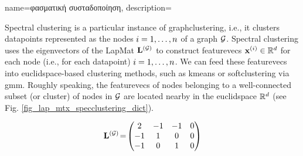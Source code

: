 {name={\foreignlanguage{greek}{φασματική συσταδοποίηση}},
	description={Spectral \gls{clustering} is a particular instance of 
		\gls{graphclustering}, i.e., it clusters \gls{datapoint}s 
		represented as the nodes $i=1, \ldots, n$ of a \gls{graph} $\mathcal{G}$. 
		Spectral \gls{clustering} uses the \gls{eigenvector}s of the \gls{LapMat} ${\bf L}^{(\mathcal{G})}$ 
		to construct \gls{featurevec}s ${\bf x}^{(i)} \in \mathbb{R}^{d}$ 
		for each node (i.e., for each \gls{datapoint}) $i=1, \ldots, n$. We can feed these \gls{featurevec}s 
		into \gls{euclidspace}-based \gls{clustering} methods, such as \gls{kmeans} 
		or \gls{softclustering} via \gls{gmm}. Roughly speaking, the \gls{featurevec}s of nodes 
		belonging to a well-connected subset (or \gls{cluster}) of nodes in $\mathcal{G}$ are located 
		nearby in the \gls{euclidspace} $\mathbb{R}^{d}$ (see Fig. \ref{fig_lap_mtx_specclustering_dict}). 
		\begin{figure}[H]
			\begin{center}
				\begin{minipage}{0.4\textwidth}
				\end{minipage} 
				\hspace*{5mm}
				\begin{minipage}{0.4\textwidth}
					\begin{equation} 
						{\bf L}^{(\mathcal{G})}\!=\!
						\begin{pmatrix} 
							2 & -1 & -1 & 0 \\ 
							-1 & 1 & 0 & 0 \\  
							-1 & 0 & 1 & 0 \\ 

\end{pmatrix}
\end{equation}
\end{minipage}
\end{center}
\end{figure}}}
